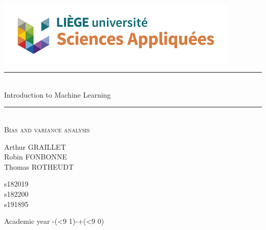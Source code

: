 \documentclass[a4paper,10pt]{article}
\newcommand{\HRule}{\rule{\linewidth}{0.5mm}} %
\newcommand{\schoolyear}{\the\numexpr\year-(\ifnum\month<9 1\else 0\fi)\relax-\the\numexpr\year+(\ifnum\month<9 0\else 1\fi)} %
\begin{document}
\begin{titlepage}
   \begin{center}

    ~\\[4cm]
    \includegraphics[scale=0.9]{images/facsa.png}
    ~\\[1.5cm]
    \HRule \\[0.4cm]
    {\huge Introduction to Machine Learning\\[0.4cm] }

    \HRule \\[1cm]
    
    \textsc{\Large Bias and variance analysis}\\[2cm]
    \vspace{2cm}
    \begin{minipage}{0.3\textwidth}
      \begin{flushleft} \large
        Arthur \textsc{GRAILLET}\\
        Robin \textsc{FONBONNE}\\
        Thomas \textsc{ROTHEUDT}
      \end{flushleft}
    \end{minipage}
    \begin{minipage}{0.3\textwidth}
      \begin{flushright}\large
        s182019\\
        s182200\\
        s191895
      \end{flushright}
    \end{minipage}

    \vfill

    {\large Academic year \schoolyear}

  \end{center}
\end{titlepage}
\newpage

\end{document}
